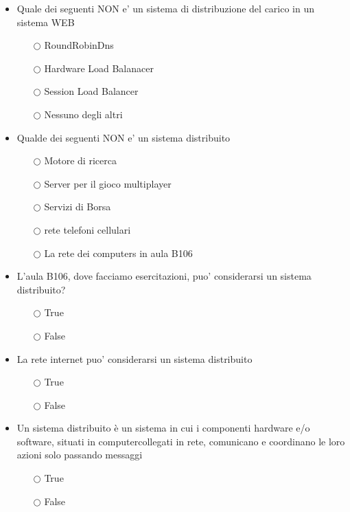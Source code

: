 \documentclass[10pt,twocolumn]{article}
\begin{document}
\begin{itemize}
    \item Quale dei seguenti NON e' un sistema di distribuzione del carico in un sistema WEB
          \begin{itemize}
              \item[$\bigcirc$] RoundRobinDns
              \item[$\bigcirc$] Hardware Load Balanacer
              \item[$\bigcirc$] Session Load Balancer
              \item[$\bigcirc$] Nessuno degli altri
          \end{itemize}
\end{itemize}
\begin{itemize}
    \item Qualde dei seguenti NON e' un sistema distribuito
          \begin{itemize}
              \item[$\bigcirc$] Motore di ricerca
              \item[$\bigcirc$] Server per il gioco multiplayer
              \item[$\bigcirc$] Servizi di Borsa
              \item[$\bigcirc$] rete telefoni cellulari
              \item[$\bigcirc$] La rete dei computers in aula B106
          \end{itemize}
\end{itemize}
\begin{itemize}
    \item L'aula B106, dove facciamo esercitazioni, puo' considerarsi un sistema distribuito?
          \begin{itemize}
              \item[$\bigcirc$] True
              \item[$\bigcirc$] False
          \end{itemize}
\end{itemize}
\begin{itemize}
    \item La rete internet puo' considerarsi un sistema distribuito
          \begin{itemize}
              \item[$\bigcirc$] True
              \item[$\bigcirc$] False
          \end{itemize}
\end{itemize}
\begin{itemize}
    \item Un sistema distribuito è un sistema in cui i componenti hardware e/o software, situati in computercollegati in rete, comunicano e coordinano le loro azioni solo passando messaggi
          \begin{itemize}
              \item[$\bigcirc$] True
              \item[$\bigcirc$] False
          \end{itemize}
\end{itemize}
\end{document}
